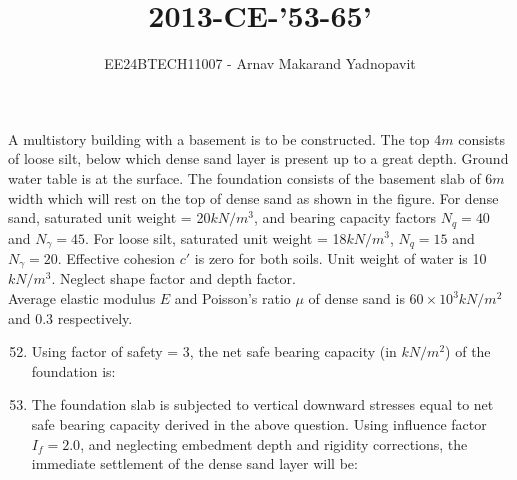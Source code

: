 \documentclass[journal,12pt,onecolumn]{IEEEtran}
\theoremstyle{remark}
\begin{document}
\title{2013-CE-'53-65'}
\author{EE24BTECH11007 - Arnav Makarand Yadnopavit}
\maketitle
\renewcommand{\thefigure}{\theenumi}
\renewcommand{\thetable}{\theenumi}
A multistory building with a basement is to be constructed. The top 4$m$ consists of loose silt, below which dense sand layer is present up to a great depth. Ground water table is at the surface. The foundation consists of the basement slab of 6$m$ width which will rest on the top of dense sand as shown in the figure. For dense sand, saturated unit weight = 20$kN/m^3$, and bearing capacity factors $N_q = 40$ and $N_\gamma = 45$. For loose silt, saturated unit weight = 18$kN/m^3$, $N_q = 15$ and $N_\gamma = 20$. Effective cohesion $c\prime$ is zero for both soils. Unit weight of water is 10$kN/m^3$. Neglect shape factor and depth factor.\\
Average elastic modulus $E$ and Poisson's ratio $\mu$ of dense sand is $60\times10^3kN/m^2$ and 0.3 respectively.
\begin{figure}[H]
\centering

\end{figure}
\begin{enumerate}
\setcounter{enumi}{51}
\item Using factor of safety = 3, the net safe bearing capacity (in $kN/m^2$) of the foundation is:
\begin{enumerate}
\end{enumerate}
\item The foundation slab is subjected to vertical downward stresses equal to net safe bearing capacity derived in the above question. Using influence factor $I_f=2.0$, and neglecting embedment depth and rigidity corrections, the immediate settlement of the dense sand layer will be:
\begin{enumerate}
\end{enumerate}
\end{enumerate}
\end{document}

